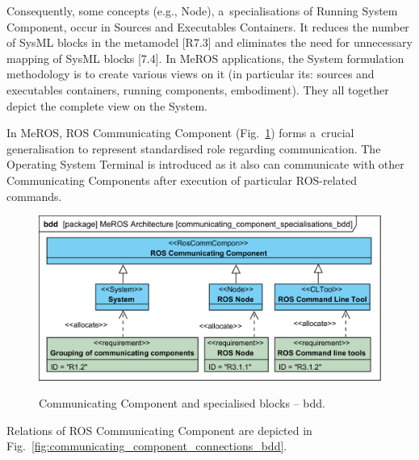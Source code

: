 \documentclass[11pt,oneside,a4paper]{report}
\begin{document}
	Consequently, some concepts (e.g., Node), a~specialisations of Running System Component, occur in Sources and Executables Containers. It reduces the number of SysML blocks in the metamodel [R7.3] and eliminates the need for unnecessary mapping of SysML blocks [7.4]. In MeROS applications, the System formulation methodology is to create various views on it (in particular its: sources and executables containers, running components, embodiment). They all together depict the complete view on the System.
	
	In MeROS, ROS Communicating Component (Fig.~\ref{fig:communicating_components_bdd}) forms a~crucial generalisation to represent standardised role regarding communication. The Operating System Terminal is introduced as it also can communicate with other Communicating Components after execution of particular ROS-related commands.
	
		
	\begin{figure}[H]
		\centering
		\begin{center}
			{\includegraphics[scale=.95]{diagrams/communicating_component_specialisations_bdd.png}}
		\end{center}
		\caption{Communicating Component and specialised blocks -- bdd.} 
		\label{fig:communicating_components_bdd}
	\end{figure}
	
	Relations of ROS Communicating Component are depicted in Fig.~\ref{fig:communicating_component_connections_bdd}.
	
\end{document}
